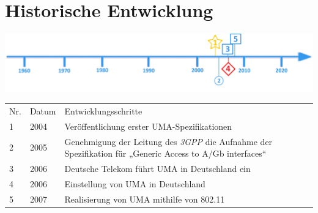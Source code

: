 \section*{Historische Entwicklung}
\includegraphics[width=\textwidth]{Kapitel/UMA/Grafiken/Zeitstrahl}
\par
\noindent
{}
\begin{tabular}{p{0.5 cm}p{1.5 cm}p{15.55 cm}}
	Nr. & Datum & Entwicklungsschritte\\
	1 & 2004 & Veröffentlichung erster UMA-Spezifikationen\\
	2 & 2005 & Genehmigung der Leitung des \textit{3GPP} die Aufnahme der Spezifikation für „Generic Access to A/Gb interfaces“ \\
	3 & 2006 & Deutsche Telekom führt UMA in Deutschland ein \\
	4 & 2006 & Einstellung von UMA in Deutschland \\
	5 & 2007 & Realisierung von UMA mithilfe von 802.11\\
\end{tabular}
\par
